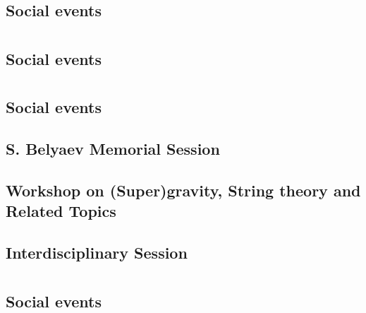 \section{}
\subsection{Social events}

\clearpage

\section{}
\subsection{Social events}

\clearpage

\section{}
\subsection{Social events}

\clearpage

\subsection{S. Belyaev Memorial Session}

\clearpage

\subsection{Workshop on (Super)gravity, String theory and Related Topics}

\clearpage

\subsection{Interdisciplinary Session}

\clearpage

\section{}
\subsection{Social events}

\clearpage

